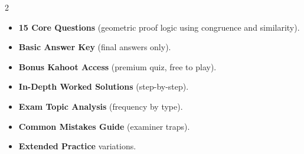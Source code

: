 \documentclass[11pt,a4paper]{article}
\newcommand{\FullReleaseDate}{April 30, 2026}
\begin{document}
\vspace{8pt}

\begin{multicols}{2}
  \begin{tcolorbox}[card, title=\sffamily\bfseries\textcolor{white}{\faHandPointDown\ TODAY (Simplified Version)}, colbacktitle=mainblue, boxed title style={sharp corners, boxrule=0pt}]
    \begin{itemize}[leftmargin=1.2em, itemsep=2pt]
      \item \small \textbf{15 Core Questions} (geometric proof logic using congruence and similarity).
      \item \small \textbf{Basic Answer Key} (final answers only).
      \item \small \textbf{Bonus Kahoot Access} (premium quiz, free to play).
    \end{itemize}
  \end{tcolorbox}

  \columnbreak

  \begin{tcolorbox}[card, title=\sffamily\bfseries\textcolor{white}{\faRocket\ ON \FullReleaseDate\ (Full Upgrade)}, colbacktitle=mainblue, boxed title style={sharp corners, boxrule=0pt}]
    \begin{itemize}[leftmargin=1.2em, itemsep=2pt]
      \item \small \textbf{In-Depth Worked Solutions} (step-by-step).
      \item \small \textbf{Exam Topic Analysis} (frequency by type).
      \item \small \textbf{Common Mistakes Guide} (examiner traps).
      \item \small \textbf{Extended Practice} variations.
    \end{itemize}
  \end{tcolorbox}
\end{multicols}
\end{document}
